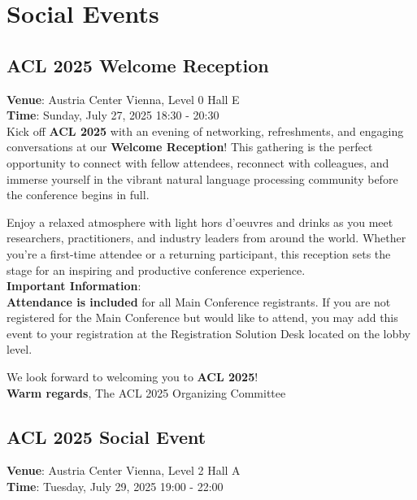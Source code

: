 \chapter{Social Events}

\section{ACL 2025 Welcome Reception}
\vspace*{0.2cm}

\textbf{Venue}: Austria Center Vienna, Level 0 Hall E\\
\textbf{Time}: Sunday, July 27, 2025 18:30 - 20:30\\

Kick off \textbf{ACL 2025} with an evening of networking, refreshments, and engaging conversations at our \textbf{Welcome Reception}! This gathering is the perfect opportunity to connect with fellow attendees, reconnect with colleagues, and immerse yourself in the vibrant natural language processing community before the conference begins in full.

Enjoy a relaxed atmosphere with light hors d’oeuvres and drinks as you meet researchers, practitioners, and industry leaders from around the world. Whether you're a first-time attendee or a returning participant, this reception sets the stage for an inspiring and productive conference experience.\\

\textbf{Important Information}:\\
\textbf{Attendance is included} for all Main Conference registrants.
If you are not registered for the Main Conference but would like to attend, you may add this event to your registration at the Registration Solution Desk located on the lobby level.

We look forward to welcoming you to \textbf{ACL 2025}!\\

\textbf{Warm regards},
The ACL 2025 Organizing Committee

\clearpage

\section{ACL 2025 Social Event}
\vspace*{0.2cm}

\textbf{Venue}: Austria Center Vienna, Level 2 Hall A\\
\textbf{Time}: Tuesday, July 29, 2025 19:00 - 22:00\\

